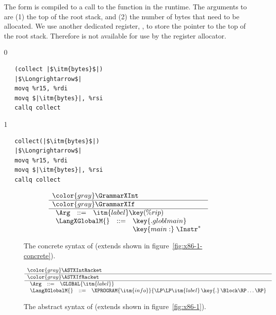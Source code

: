 \documentclass[7x10]{TimesAPriori_MIT}%
\newcommand{\gray}[1]{{\color{gray} #1}}
\def\racketEd{0}
\def\pythonEd{1}
\def\edition{0}
\numberwithin{theorem}{chapter}
\numberwithin{definition}{chapter}
\numberwithin{equation}{chapter}
\begin{document}
%
The  form is compiled to a call to the 
function in the runtime. The arguments to  are (1) the
top of the root stack, and (2) the number of bytes that need to be
allocated.  We use another dedicated register, , to store
the pointer to the top of the root stack. Therefore  is not
available for use by the register allocator.
%
{\if\edition\racketEd
\begin{lstlisting}
   (collect |$\itm{bytes}$|)
   |$\Longrightarrow$|
   movq %r15, %rdi
   movq $|\itm{bytes}|, %rsi
   callq collect
\end{lstlisting}
\fi}
{\if\edition\pythonEd    
\begin{lstlisting}
   collect(|$\itm{bytes}$|)
   |$\Longrightarrow$|
   movq %r15, %rdi
   movq $|\itm{bytes}|, %rsi
   callq collect
\end{lstlisting}
\fi}


\newcommand{\GrammarXGlobal}{
\begin{array}{lcl}
  \Arg &::=& \itm{label} \key{(\%rip)} 
\end{array}
}

\newcommand{\ASTXGlobalRacket}{
\begin{array}{lcl}
  \Arg &::=&  \GLOBAL{\itm{label}} 
\end{array}
}


\begin{figure}[tp]
  \begin{tcolorbox}[colback=white]
\[
\begin{array}{l}
  \gray{\GrammarXInt} \\ \hline
  \gray{\GrammarXIf} \\ \hline
  \GrammarXGlobal \\
\begin{array}{lcl}
\LangXGlobalM{} &::= &  \key{.globl main} \\
      &    &  \key{main:} \; \Instr^{*} 
\end{array}
\end{array}
\]
  \end{tcolorbox}
\caption{The concrete syntax of \LangXGlobal{}  (extends \LangXIf{} shown in figure~\ref{fig:x86-1-concrete}).}
\label{fig:x86-2-concrete}
\end{figure}

\begin{figure}[tp]
\begin{tcolorbox}[colback=white]
    \small
\[
\begin{array}{l}
  \gray{\ASTXIntRacket} \\ \hline
  \gray{\ASTXIfRacket} \\ \hline
  \ASTXGlobalRacket \\
\begin{array}{lcl}
\LangXGlobalM{} &::= & \XPROGRAM{\itm{info}}{\LP\LP\itm{label} \,\key{.}\, \Block \RP\ldots\RP}
\end{array}
\end{array}
\]
\end{tcolorbox}

\caption{The abstract syntax of \LangXGlobal{} (extends \LangXIf{} shown in figure~\ref{fig:x86-1}).}
\label{fig:x86-2}
\end{figure}
\end{document}
